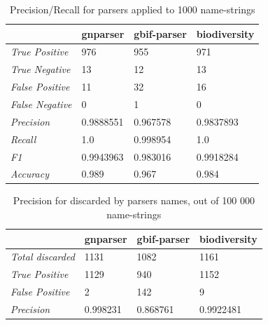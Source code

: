 \documentclass{bmcart}
\begin{document}
\begin{table}[htb]
  \begin{center}
    \caption{Precision/Recall for parsers applied to 1000
    name-strings}\label{table:precision}
    \resizebox{10cm}{!} {\begin{tabular}{|l|*{3}{l}|}
      \hline
                             & gnparser & gbif-parser & biodiversity \\
      \hline
      \textit{True Positive} & 976      & 955         & 971          \\
      \textit{True Negative} & 13       & 12          & 13           \\
      \textit{False Positive}& 11       & 32          & 16           \\
      \textit{False Negative}& 0        & 1           & 0            \\
      \textit{Precision}     & 0.9888551& 0.967578    & 0.9837893    \\
      \textit{Recall}        & 1.0      & 0.998954    & 1.0          \\
      \textit{F1}            & 0.9943963& 0.983016    & 0.9918284    \\
      \textit{Accuracy}      & 0.989    & 0.967       & 0.984        \\
      \hline
    \end{tabular}
    }
  \end{center}
\end{table}

\begin{table}[htb]
  \begin{center}
    \caption{Precision for discarded by parsers names, out of 100 000
    name-strings}\label{table:unparsed}
    \resizebox{10cm}{!} {\begin{tabular}{| l | *{3}{l} |}
      \hline
                              & gnparser & gbif-parser & biodiversity \\
      \hline
      \textit{Total discarded}& 1131     & 1082        & 1161         \\
      \textit{True Positive}  & 1129     & 940         & 1152         \\
      \textit{False Positive} & 2        & 142         & 9            \\
      \textit{Precision}      & 0.998231 & 0.868761    & 0.9922481    \\
      \hline
    \end{tabular}
  }
  \end{center}
\end{table}
\end{document}
